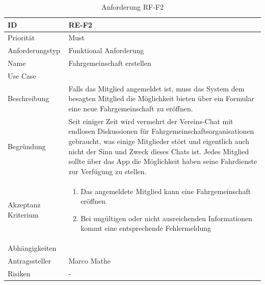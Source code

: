 \begin{table}[ht]
\centering
  \begin{tabular}{ l | p{8cm} }
	\hline
	\rowcolor{gray}
	ID 			&	\textbf{RE-F2}\\ \hline
	Priorität 		&	Must\\ \hline
	Anforderungstyp	&	Funktional Anforderung\\ \hline
	Name 			&	Fahrgemeinschaft erstellen\\ \hline
	Use Case 		&	\nameref{table:use_case_1}\\ \hline
	Beschreibung 	&	Falls das Mitglied angemeldet ist, muss das System dem besagten Mitglied die Möglichkeit bieten über ein Formular eine neue Fahrgemeinschaft zu eröffnen.\\ \hline
	Begründung 		&	Seit einiger Zeit wird vermehrt der Vereins-Chat mit endlosen Diskussionen für Fahrgemeinschaftsorganisationen gebraucht, was einige Mitglieder stört und eigentlich auch nicht der Sinn und Zweck dieses Chats ist. Jedes Mitglied sollte über das App die Möglichkeit haben seine Fahrdienste zur Verfügung zu stellen.\\ \hline
	Akzeptanz Kriterium	&	\begin{enumerate}
					\item Das angemeldete Mitglied kann eine Fahrgemeinschaft eröffnen
					\item Bei ungültigen oder nicht ausreichenden Informationen kommt eine entsprechende Fehlermeldung
					\end{enumerate}
					\\ \hline
	Abhängigkeiten 	&	\nameref{table:req_1}\\ \hline
	Antragssteller 	&	Marco Mathe\\ \hline
	Risiken	 	&	-
  \end{tabular}
   \caption{Anforderung RF-F2}\label{table:req_2}
\end{table}

